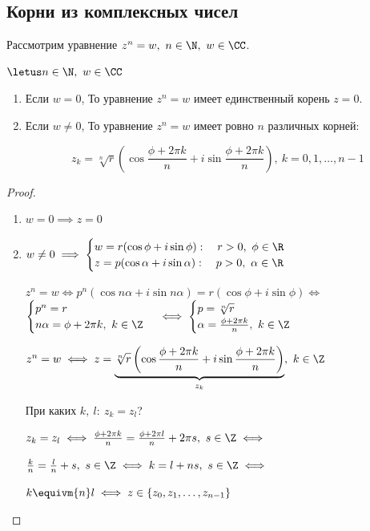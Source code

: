 \subsection{Корни из комплексных чисел}

Рассмотрим уравнение $z^n = w,~n \in \N,~w \in \CC$.

\begin{theorem}
    $\letus n \in \N,~w \in \CC$

    \begin{enumerate}
        \item Если $w = 0$, То уравнение $z^n = w$ имеет единственный корень $z = 0$.
        
        \item Если $w \neq 0$, То уравнение $z^n = w$ имеет ровно $n$ различных корней:
    
        \[ z_k = \sqrt[n]{r} \left(\cos \frac{\phi + 2 \pi k}{n} + i \sin \frac{\phi + 2 \pi k}{n}\right),~k = 0, 1, \ldots, n-1 \]

    \end{enumerate}
\end{theorem}

\begin{proof}

    \begin{enumerate}
        \item $w = 0 \implies z = 0$

        \item $w \neq 0 \implies \begin{cases}
            w = r (\cos \phi + i \sin \phi):\quad r > 0,~\phi \in \R\\
            z = p (\cos \alpha + i \sin \alpha):\quad p > 0,~\alpha \in \R
        \end{cases}$
    
        $z^n = w \iff p^n (\cos n \alpha + i \sin n \alpha) = r (\cos \phi + i \sin \phi) \iff$
        $\begin{cases}
            p^n = r\\
            n \alpha = \phi + 2 \pi k,~k \in \Z
        \end{cases} \iff \begin{cases}
            p = \sqrt[n]{r}\\
            \alpha = \frac{\phi + 2 \pi k}{n},~k \in \Z
        \end{cases}$
    
        $z^n = w \iff z = \underbrace{\sqrt[n]{r} \left(\cos \frac{\phi + 2 \pi k}{n} + i \sin \frac{\phi + 2 \pi k}{n}\right)}_{z_k},~k \in \Z$
    
        При каких $k,~l:\ z_k = z_l$?
    
        $z_k = z_l \iff \frac{\phi + 2 \pi k}{n} = \frac{\phi + 2 \pi l}{n} + 2 \pi s,~ s \in \Z \iff$ 
        
        $\frac{k}{n} = \frac{l}{n} + s,~s \in \Z \iff k = l + ns,~s \in \Z \iff $
        
        $k \equivm{n} l \iff z \in \{z_0, z_1, \ldots, z_{n-1}\}$
    \end{enumerate}
\end{proof}

